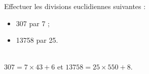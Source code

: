 \begin{exercice*}
    Effectuer les divisions euclidiennes suivantes :
    \begin{itemize}
       \item 307 par 7 ;
       \item \num{13 758} par 25.
    \end{itemize}
 \end{exercice*}
 \begin{corrige}
    {\small {} \hfill {}} \\
    {\red $307 =7\times43+6$} \hfill et \hfill {\red $\num{13 758} =25\times550+8$}.
 \end{corrige}